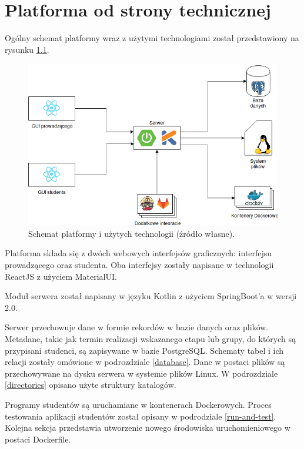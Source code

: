 \chapter{Platforma od strony technicznej}
\label{chapter:platform-technical}
Ogólny schemat platformy wraz z użytymi technologiami został przedstawiony na rysunku \ref{fig:platform-schema}.

\begin{figure}[h]
    \centering
    \includegraphics[width = 13cm]{chapter02/platform_schema.png}
    \caption{Schemat platformy i użytych technologii (źródło własne).}
    \label{fig:platform-schema}
\end{figure}

Platforma składa się z dwóch webowych interfejsów graficznych: interfejsu prowadzącego oraz studenta.
Oba interfejsy zostały napisane w technologii ReactJS z użyciem MaterialUI.

Moduł serwera został napisany w języku Kotlin z użyciem SpringBoot’a w wersji 2.0.

Serwer przechowuje dane w formie rekordów w bazie danych oraz plików.
Metadane, takie jak termin realizacji wskazanego etapu lub grupy, do których są przypisani studenci, są zapisywane w bazie PostgreSQL.
Schematy tabel i ich relacji zostały omówione w podrozdziale \ref{database}.
Dane w postaci plików są przechowywane na dysku serwera w systemie plików Linux.
W podrozdziale \ref{directories} opisano użyte struktury katalogów.

Programy studentów są uruchamiane w kontenerach Dockerowych.
Proces testowania aplikacji studentów został opisany w podrodziale \ref{run-and-test}.
Kolejna sekcja przedstawia utworzenie nowego środowiska uruchomieniowego w postaci Dockerfile.

